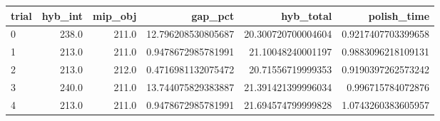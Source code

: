 \begin{tabular}{lrrrrr}
\hline
trial & hyb_int & mip_obj & gap_pct & hyb_total & polish_time \\ \hline
0 & 238.0 & 211.0 & 12.796208530805687 & 20.300720700004604 & 0.9217407703399658 \\
1 & 213.0 & 211.0 & 0.9478672985781991 & 21.10048240001197 & 0.9883096218109131 \\
2 & 213.0 & 212.0 & 0.4716981132075472 & 20.71556719999353 & 0.9190397262573242 \\
3 & 240.0 & 211.0 & 13.744075829383887 & 21.391421399996034 & 0.996715784072876 \\
4 & 213.0 & 211.0 & 0.9478672985781991 & 21.694574799999828 & 1.0743260383605957 \\
\hline
\end{tabular}
